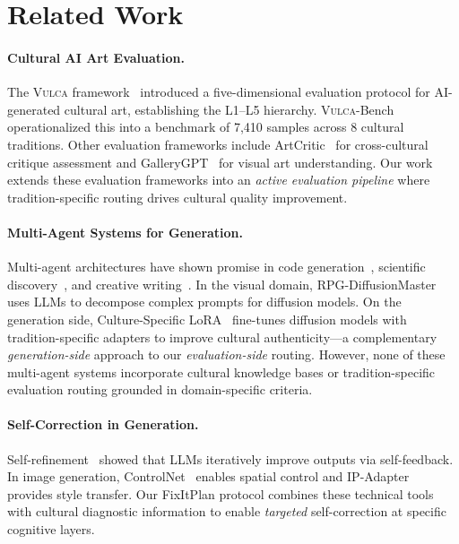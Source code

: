 \documentclass[sigconf, screen, review, anonymous]{acmart}
\newcommand{\vulca}{\textsc{Vulca}}
\newcommand{\Lx}[1]{L#1}
\begin{document}
\section{Related Work}
\label{sec:related}

\paragraph{Cultural AI Art Evaluation.}
The \vulca{} framework~\cite{yu2025vulca} introduced a five-dimensional evaluation protocol for AI-generated cultural art, establishing the \Lx{1}--\Lx{5} hierarchy.
\vulca{}-Bench~\cite{yu2025vulcabench} operationalized this into a benchmark of 7,410 samples across 8 cultural traditions.
Other evaluation frameworks include ArtCritic~\cite{yu2025artcritique} for cross-cultural critique assessment and GalleryGPT~\cite{gallerygpt2024} for visual art understanding.
Our work extends these evaluation frameworks into an \emph{active evaluation pipeline} where tradition-specific routing drives cultural quality improvement.

\paragraph{Multi-Agent Systems for Generation.}
Multi-agent architectures have shown promise in code generation~\cite{hong2024metagpt}, scientific discovery~\cite{boiko2023autonomous}, and creative writing~\cite{qian2024chatdev}.
In the visual domain, RPG-Diffusion\-Master~\cite{yang2024mastering} uses LLMs to decompose complex prompts for diffusion models.
On the generation side, Culture-Specific LoRA~\cite{chen2025culture} fine-tunes diffusion models with tradition-specific adapters to improve cultural authenticity---a complementary \emph{generation-side} approach to our \emph{evaluation-side} routing.
However, none of these multi-agent systems incorporate cultural knowledge bases or tradition-specific evaluation routing grounded in domain-specific criteria.

\paragraph{Self-Correction in Generation.}
Self-refinement~\cite{madaan2024self} showed that LLMs iteratively improve outputs via self-feedback.
In image generation, ControlNet~\cite{zhang2023adding} enables spatial control and IP-Adapter~\cite{ye2023ip} provides style transfer.
Our FixItPlan protocol combines these technical tools with cultural diagnostic information to enable \emph{targeted} self-correction at specific cognitive layers.
\end{document}
